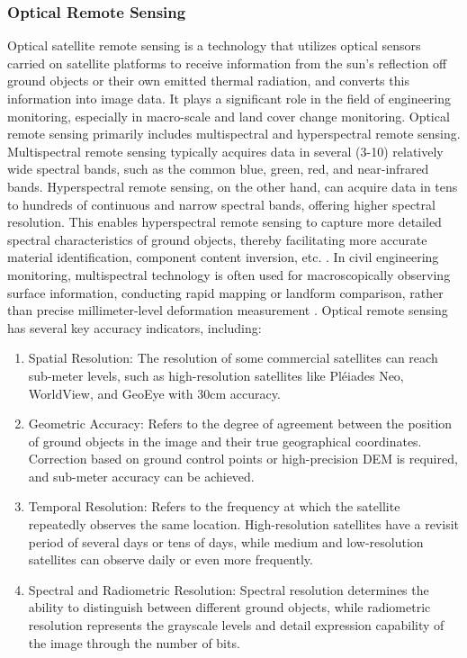 \documentclass[preprint,11pt,authoryear,3p]{elsarticle}
\begin{document}
\subsubsection{Optical Remote Sensing}

Optical satellite remote sensing is a technology that utilizes optical sensors carried on satellite platforms to receive information from the sun's reflection off ground objects or their own emitted thermal radiation, and converts this information into image data. It plays a significant role in the field of engineering monitoring, especially in macro-scale and land cover change monitoring. Optical remote sensing primarily includes multispectral and hyperspectral remote sensing. Multispectral remote sensing typically acquires data in several (3-10) relatively wide spectral bands, such as the common blue, green, red, and near-infrared bands. Hyperspectral remote sensing, on the other hand, can acquire data in tens to hundreds of continuous and narrow spectral bands, offering higher spectral resolution. This enables hyperspectral remote sensing to capture more detailed spectral characteristics of ground objects, thereby facilitating more accurate material identification, component content inversion, etc. \citep{colomina2014unmanned}. In civil engineering monitoring, multispectral technology is often used for macroscopically observing surface information, conducting rapid mapping or landform comparison, rather than precise millimeter-level deformation measurement \citep{joshi2016review, casas2024remote}. Optical remote sensing has several key accuracy indicators, including:

\begin{enumerate}
\item Spatial Resolution: The resolution of some commercial satellites can reach sub-meter levels, such as high-resolution satellites like Pléiades Neo, WorldView, and GeoEye with 30cm accuracy.
\item Geometric Accuracy: Refers to the degree of agreement between the position of ground objects in the image and their true geographical coordinates. Correction based on ground control points or high-precision DEM is required, and sub-meter accuracy can be achieved.
\item Temporal Resolution: Refers to the frequency at which the satellite repeatedly observes the same location. High-resolution satellites have a revisit period of several days or tens of days, while medium and low-resolution satellites can observe daily or even more frequently.
\item Spectral and Radiometric Resolution: Spectral resolution determines the ability to distinguish between different ground objects, while radiometric resolution represents the grayscale levels and detail expression capability of the image through the number of bits.
\end{enumerate}
\end{document}
